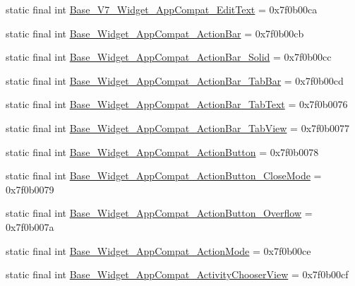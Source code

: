 \begin{CompactItemize}
\item 
static final int \hyperlink{classandroid_1_1support_1_1v7_1_1mediarouter_1_1_r_1_1style_f9788dbecc676f938ca32787a2597000}{Base\_\-V7\_\-Widget\_\-AppCompat\_\-EditText} = 0x7f0b00ca
\item 
static final int \hyperlink{classandroid_1_1support_1_1v7_1_1mediarouter_1_1_r_1_1style_cd654af039ed63f4317f23bad61c8ab9}{Base\_\-Widget\_\-AppCompat\_\-ActionBar} = 0x7f0b00cb
\item 
static final int \hyperlink{classandroid_1_1support_1_1v7_1_1mediarouter_1_1_r_1_1style_546cf538745ecc5bc7d3b952070282b7}{Base\_\-Widget\_\-AppCompat\_\-ActionBar\_\-Solid} = 0x7f0b00cc
\item 
static final int \hyperlink{classandroid_1_1support_1_1v7_1_1mediarouter_1_1_r_1_1style_9624ed3836562a45fc32a89f93dae7b9}{Base\_\-Widget\_\-AppCompat\_\-ActionBar\_\-TabBar} = 0x7f0b00cd
\item 
static final int \hyperlink{classandroid_1_1support_1_1v7_1_1mediarouter_1_1_r_1_1style_7b9cef2a2fc7067fef32a28674cf9dd2}{Base\_\-Widget\_\-AppCompat\_\-ActionBar\_\-TabText} = 0x7f0b0076
\item 
static final int \hyperlink{classandroid_1_1support_1_1v7_1_1mediarouter_1_1_r_1_1style_d83bc422fec2efb815a48f2aab9ca66b}{Base\_\-Widget\_\-AppCompat\_\-ActionBar\_\-TabView} = 0x7f0b0077
\item 
static final int \hyperlink{classandroid_1_1support_1_1v7_1_1mediarouter_1_1_r_1_1style_41d9e49ee51ee7981d65b91cf68dad76}{Base\_\-Widget\_\-AppCompat\_\-ActionButton} = 0x7f0b0078
\item 
static final int \hyperlink{classandroid_1_1support_1_1v7_1_1mediarouter_1_1_r_1_1style_7d9c2ba9d4ccbf68792701d72fbe3eee}{Base\_\-Widget\_\-AppCompat\_\-ActionButton\_\-CloseMode} = 0x7f0b0079
\item 
static final int \hyperlink{classandroid_1_1support_1_1v7_1_1mediarouter_1_1_r_1_1style_ac6e3a707debdc4116c5835d374cb401}{Base\_\-Widget\_\-AppCompat\_\-ActionButton\_\-Overflow} = 0x7f0b007a
\item 
static final int \hyperlink{classandroid_1_1support_1_1v7_1_1mediarouter_1_1_r_1_1style_b158030aa338eeea4f7d502d85f9b490}{Base\_\-Widget\_\-AppCompat\_\-ActionMode} = 0x7f0b00ce
\item 
static final int \hyperlink{classandroid_1_1support_1_1v7_1_1mediarouter_1_1_r_1_1style_1a11c13aae28a71e09790370e4713aee}{Base\_\-Widget\_\-AppCompat\_\-ActivityChooserView} = 0x7f0b00cf
\item 

\end{CompactItemize}
